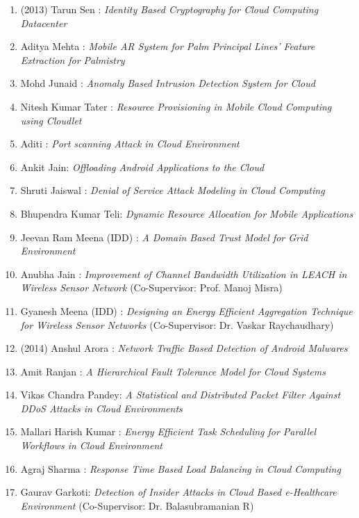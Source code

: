\begin{itemize}
\begin{enumerate}
\item	(2013) Tarun Sen : \textit{Identity Based Cryptography for Cloud Computing Datacenter}	 
\item	Aditya Mehta : \textit{Mobile AR System for Palm Principal Lines' Feature Extraction for Palmistry} 
\item		Mohd Junaid : \textit{Anomaly Based Intrusion Detection System for Cloud}	
\item		Nitesh Kumar Tater : \textit{Resource Provisioning in Mobile Cloud Computing using Cloudlet}
\item		Aditi : \textit{Port scanning Attack in Cloud Environment} 
\item		Ankit Jain: \textit{Offloading Android Applications to the Cloud}
\item		Shruti Jaiswal : \textit{Denial of Service Attack Modeling in Cloud Computing}
\item		Bhupendra Kumar Teli: \textit{Dynamic Resource Allocation for Mobile Applications}
\item		Jeevan Ram Meena (IDD) : \textit{A Domain Based Trust Model for Grid Environment}
\item		Anubha Jain : \textit{Improvement of Channel Bandwidth Utilization in LEACH in Wireless Sensor Network} (Co-Supervisor:	Prof. Manoj Misra)	
\item		Gyanesh Meena (IDD) : \textit{Designing an Energy Efficient Aggregation Technique for Wireless Sensor Networks} (Co-Supervisor: Dr. Vaskar Raychaudhary)



\item	(2014) Anshul Arora : \textit{Network Traffic Based Detection of Android Malwares}	
\item		Amit Ranjan : \textit{A Hierarchical Fault Tolerance Model for Cloud Systems}	
\item     Vikas Chandra Pandey: \textit{A Statistical and Distributed Packet Filter Against DDoS Attacks in Cloud Environments} 
\item		Mallari Harish Kumar : \textit{Energy Efficient Task Scheduling for Parallel Workflows in Cloud Environment}	
\item		Agraj Sharma : \textit{Response Time Based Load Balancing in Cloud Computing} 
\item		Gaurav Garkoti: \textit{Detection of Insider Attacks in Cloud Based e-Healthcare Environment} (Co-Supervisor: Dr. Balasubramanian R)


\end{enumerate}
\end{itemize}
